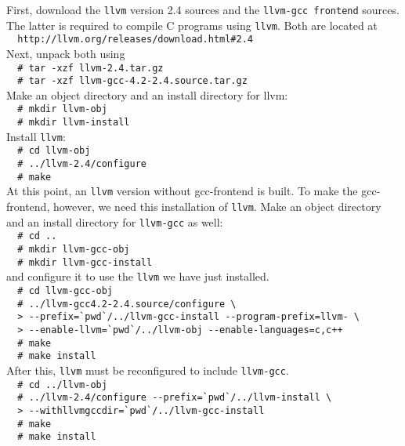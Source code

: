 First, download the \verb|llvm| version 2.4 sources and the
\verb|llvm-gcc frontend| sources.
The latter is required to compile C programs using \verb|llvm|.
Both are located at\\
\verb|  http://llvm.org/releases/download.html#2.4|\\
Next, unpack both using\\
\verb|  # tar -xzf llvm-2.4.tar.gz|\\
\verb|  # tar -xzf llvm-gcc-4.2-2.4.source.tar.gz|\\
Make an object directory and an install directory for llvm:\\
\verb|  # mkdir llvm-obj|\\
\verb|  # mkdir llvm-install|\\
Install \verb|llvm|:\\
\verb|  # cd llvm-obj|\\
\verb|  # ../llvm-2.4/configure|\\
\verb|  # make|\\
At this point, an \verb|llvm| version without gcc-frontend is built.
To make the gcc-frontend, however, we need this installation of \verb|llvm|.
Make an object directory and an install directory for \verb|llvm-gcc| as well:\\
\verb|  # cd ..|\\
\verb|  # mkdir llvm-gcc-obj|\\
\verb|  # mkdir llvm-gcc-install|\\
and configure it to use the \verb|llvm| we have just installed.\\
\verb|  # cd llvm-gcc-obj|\\
\verb|  # ../llvm-gcc4.2-2.4.source/configure \ |\\
\verb|  > --prefix=`pwd`/../llvm-gcc-install --program-prefix=llvm- \ |\\
\verb|  > --enable-llvm=`pwd`/../llvm-obj --enable-languages=c,c++ |\\
\verb|  # make|\\
\verb|  # make install|\\
After this, \verb|llvm| must be reconfigured to include \verb|llvm-gcc|.\\
\verb|  # cd ../llvm-obj|\\
\verb|  # ../llvm-2.4/configure --prefix=`pwd`/../llvm-install \ |\\
\verb|  > --withllvmgccdir=`pwd`/../llvm-gcc-install|\\
\verb|  # make |\\
\verb|  # make install |

